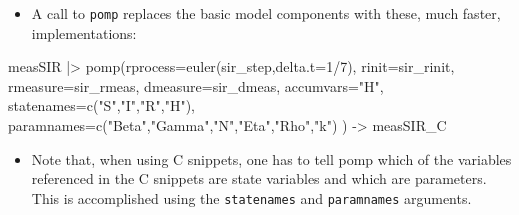 \documentclass[
  ignorenonframetext,
  aspectratio=169,
  t]{beamer}
\newenvironment{Shaded}{\begin{snugshade}}{\end{snugshade}}
\newcommand{\AttributeTok}[1]{\textcolor[rgb]{0.40,0.45,0.13}{#1}}
\newcommand{\DecValTok}[1]{\textcolor[rgb]{0.68,0.00,0.00}{#1}}
\newcommand{\FunctionTok}[1]{\textcolor[rgb]{0.28,0.35,0.67}{#1}}
\newcommand{\NormalTok}[1]{\textcolor[rgb]{0.00,0.23,0.31}{#1}}
\newcommand{\OtherTok}[1]{\textcolor[rgb]{0.00,0.23,0.31}{#1}}
\newcommand{\SpecialCharTok}[1]{\textcolor[rgb]{0.37,0.37,0.37}{#1}}
\newcommand{\StringTok}[1]{\textcolor[rgb]{0.13,0.47,0.30}{#1}}
\providecommand{\tightlist}{%
  \setlength{\itemsep}{0pt}\setlength{\parskip}{0pt}}\usepackage{longtable,booktabs,array}
\theoremstyle{definition}
\begin{document}
\begin{frame}[fragile]
\begin{itemize}
\tightlist
\item
  A call to \texttt{pomp} replaces the basic model components with
  these, much faster, implementations:
\end{itemize}

\begin{Shaded}
\begin{Highlighting}[]
\NormalTok{    measSIR }\SpecialCharTok{|\textgreater{}}
      \FunctionTok{pomp}\NormalTok{(}\AttributeTok{rprocess=}\FunctionTok{euler}\NormalTok{(sir\_step,}\AttributeTok{delta.t=}\DecValTok{1}\SpecialCharTok{/}\DecValTok{7}\NormalTok{),}
        \AttributeTok{rinit=}\NormalTok{sir\_rinit,}
        \AttributeTok{rmeasure=}\NormalTok{sir\_rmeas,}
        \AttributeTok{dmeasure=}\NormalTok{sir\_dmeas,}
        \AttributeTok{accumvars=}\StringTok{"H"}\NormalTok{,}
        \AttributeTok{statenames=}\FunctionTok{c}\NormalTok{(}\StringTok{"S"}\NormalTok{,}\StringTok{"I"}\NormalTok{,}\StringTok{"R"}\NormalTok{,}\StringTok{"H"}\NormalTok{),}
        \AttributeTok{paramnames=}\FunctionTok{c}\NormalTok{(}\StringTok{"Beta"}\NormalTok{,}\StringTok{"Gamma"}\NormalTok{,}\StringTok{"N"}\NormalTok{,}\StringTok{"Eta"}\NormalTok{,}\StringTok{"Rho"}\NormalTok{,}\StringTok{"k"}\NormalTok{)}
\NormalTok{      ) }\OtherTok{{-}\textgreater{}}\NormalTok{ measSIR\_C}
\end{Highlighting}
\end{Shaded}

\begin{itemize}
\tightlist
\item
  Note that, when using C snippets, one has to tell pomp which of the
  variables referenced in the C snippets are state variables and which
  are parameters. This is accomplished using the \texttt{statenames} and
  \texttt{paramnames} arguments.
\end{itemize}
\end{frame}
\end{document}
